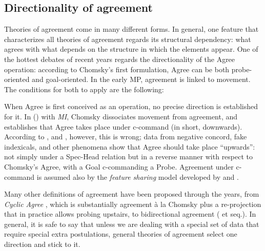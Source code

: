 \documentclass[output=paper
,modfonts
,nonflat]{langsci/langscibook}
\begin{document}
\subsection{Directionality of agreement}\label{sec-dalessandro:4.1}
Theories of agreement come in many different forms. In general, one feature that characterizes all theories of agreement regards its structural dependency: what agrees with what depends on the structure in which the elements appear. One of the hottest debates of recent years regards the directionality of the Agree operation: according to Chomsky’s first formulation, Agree can be both probe-oriented and goal-oriented. In the early MP, agreement is linked to movement. The conditions for both to apply are the following:

When Agree is first conceived as an operation, no precise direction is established for it. In (\citeyear{Chomsky2000}) with \textit{MI}, Chomsky dissociates movement from agreement, and establishes that Agree takes place under c-command (in short, downwards). According to \citet{Zeijlstra2012}, \citet{Bjorkman_ZeijlstraTA} and \citet{Wurmbrand2012, Wurmbrand2014, Wurmbrand2017}, however, this is wrong; data from negative concord, fake indexicals, and other phenomena show that Agree should take place “upwards”: not simply under a Spec-Head relation but in a reverse manner with respect to Chomsky’s Agree, with a Goal c-commanding a Probe. Agreement under c-command is assumed also by the \textit{feature sharing} model developed by \citet{Pesetsky_Torrego2007} and \citet{Preminger2012, Preminger2013, Preminger2014}.

Many other definitions of agreement have been proposed through the years, from \textit{Cyclic Agree} \citep{Bejar_Rezac2009}, which is substantially agreement à la Chomsky plus a re-projection that in practice allows probing upstairs, to bidirectional agreement (\citealt{Boskovic2007} et seq.). In general, it is safe to say that unless we are dealing with a special set of data that require special extra postulations, general theories of agreement select one direction and stick to it.
\end{document}
